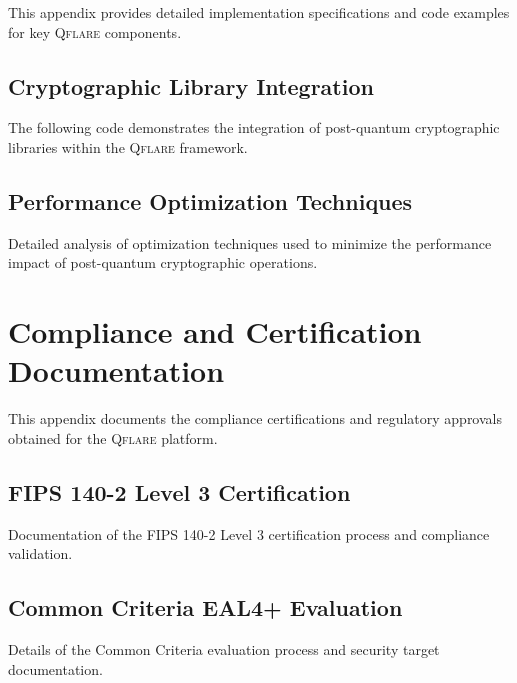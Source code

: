 \documentclass[12pt,a4paper,twoside]{book}
\newcommand{\qflare}{\textsc{Qflare}}
\begin{document}
This appendix provides detailed implementation specifications and code examples for key \qflare{} components.

\section{Cryptographic Library Integration}
\label{sec:crypto-integration}

The following code demonstrates the integration of post-quantum cryptographic libraries within the \qflare{} framework.

\section{Performance Optimization Techniques}
\label{sec:performance-optimization}

Detailed analysis of optimization techniques used to minimize the performance impact of post-quantum cryptographic operations.

\chapter{Compliance and Certification Documentation}
\label{app:compliance}

This appendix documents the compliance certifications and regulatory approvals obtained for the \qflare{} platform.

\section{FIPS 140-2 Level 3 Certification}
\label{sec:fips-certification}

Documentation of the FIPS 140-2 Level 3 certification process and compliance validation.

\section{Common Criteria EAL4+ Evaluation}
\label{sec:cc-evaluation}

Details of the Common Criteria evaluation process and security target documentation.
\end{document}

